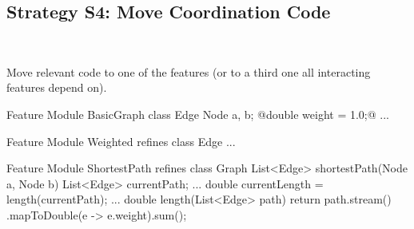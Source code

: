 \subsection{Strategy S4: Move Coordination Code}

\begin{frame}[fragile]{\myframetitle{}}
	\begin{fancycolumns}[animation=none]
		\centering
		
		~
		\begin{note}{}
			Move relevant code to one of the features (or to a third one all interacting features depend on).
		\end{note}
		\nextcolumn
\begin{codetight}{Feature Module BasicGraph}
	class Edge { Node a, b; @double weight = 1.0;@ ... }
\end{codetight}	
\begin{codetight}{Feature Module Weighted}
	refines class Edge { ... }
\end{codetight}	
\begin{codetight}{Feature Module ShortestPath}
	refines class Graph {
		List<Edge> shortestPath(Node a, Node b){
			List<Edge> currentPath;
			... 
			double currentLength = length(currentPath);
			... 
		}
		double length(List<Edge> path) {
			return path.stream()
			.mapToDouble(e -> e.weight).sum();
		}
	}
\end{codetight}	
	\end{fancycolumns}
\end{frame}


